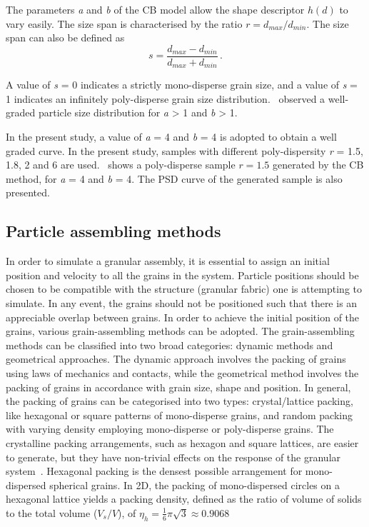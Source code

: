 The parameters \textit{a} and \textit{b} of the CB model allow the shape 
descriptor $h(d)$ to vary easily. The size span is characterised by the ratio $ 
r = d_{max}/d_{min}$. The size span can also be defined as
%
\begin{equation}
s = \frac{d_{max}-d_{min}}{d_{max}+d_{min}} \,.
\end{equation}

A value of \textit{s} = 0 indicates a strictly mono-disperse grain size, and a 
value of \textit{s} = 1 indicates an infinitely poly-disperse grain size 
distribution.~\citet{Voivret2007} observed a well-graded particle size 
distribution for \textit{a} > 1 and \textit{b} > 1. 

In the present study, a value of \textit{a} = 4 and \textit{b} = 4 is adopted 
to obtain a well graded curve. In the present study, samples with different 
poly-dispersity \textit{r} = 1.5, 1.8, 2 and 6 are used.~ 
shows a poly-disperse sample $r = 1.5$ generated by the CB method, for 
\textit{a} = 4 and \textit{b} = 4. The PSD curve of the generated 
sample is also presented.


\subsection{Particle assembling methods}
In order to simulate a granular assembly, it is essential to assign an initial 
position and velocity to all the grains in the system. Particle positions 
should be chosen to be compatible with the structure (granular fabric) one is 
attempting to simulate. In any event, the grains should not be positioned such 
that there is an appreciable overlap between grains. In order to achieve the 
initial 
position of the grains, various grain-assembling methods can be adopted. The 
grain-assembling methods can be classified into two broad categories: 
dynamic methods and geometrical approaches. The dynamic approach involves 
the packing of grains using laws of mechanics and contacts, while the 
geometrical method involves the packing of grains in accordance with grain 
size, shape and position. In general, the packing of grains can 
be categorised into two types: crystal/lattice packing, like hexagonal or 
square patterns of mono-disperse grains, and random packing with varying 
density employing mono-disperse or poly-disperse grains. The crystalline 
packing 
arrangements, such as hexagon and square lattices, are easier to generate, 
but they have non-trivial effects on the response of the granular 
system~\citep{Staron2005}. Hexagonal packing is the densest possible 
arrangement for mono-dispersed spherical grains. In 2D, the packing of 
mono-dispersed circles on a hexagonal lattice yields a packing density, defined 
as the ratio of volume of solids to the total volume ($V_s / V$), of 
$\eta_{\mathit{h}}=\frac{1}{6}\pi\sqrt{3}\approx 0.9068$



